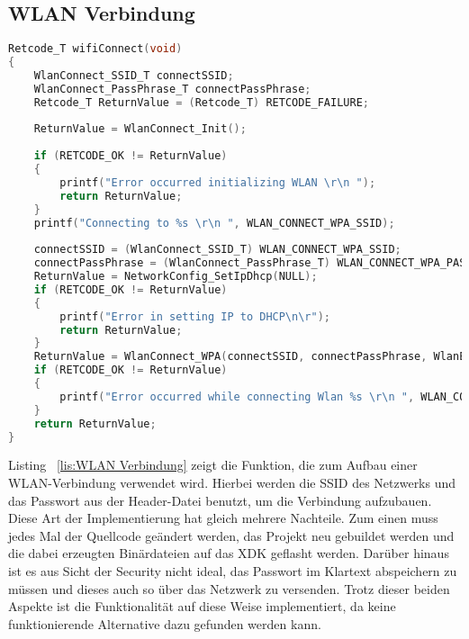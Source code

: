\subsection{\acs{WLAN} Verbindung}\label{subsec:WLAN Verbindung}
\begin{lstlisting}[language=C, caption={WLAN Verbindung}, label=lis:WLAN Verbindung]
Retcode_T wifiConnect(void)
{
	WlanConnect_SSID_T connectSSID;
	WlanConnect_PassPhrase_T connectPassPhrase;
	Retcode_T ReturnValue = (Retcode_T) RETCODE_FAILURE;
	
	ReturnValue = WlanConnect_Init();
	
	if (RETCODE_OK != ReturnValue)
	{
		printf("Error occurred initializing WLAN \r\n ");
		return ReturnValue;
	}
	printf("Connecting to %s \r\n ", WLAN_CONNECT_WPA_SSID);
	
	connectSSID = (WlanConnect_SSID_T) WLAN_CONNECT_WPA_SSID;
	connectPassPhrase = (WlanConnect_PassPhrase_T) WLAN_CONNECT_WPA_PASS;
	ReturnValue = NetworkConfig_SetIpDhcp(NULL);
	if (RETCODE_OK != ReturnValue)
	{
		printf("Error in setting IP to DHCP\n\r");
		return ReturnValue;
	}
	ReturnValue = WlanConnect_WPA(connectSSID, connectPassPhrase, WlanEventCallback);
	if (RETCODE_OK != ReturnValue)
	{
		printf("Error occurred while connecting Wlan %s \r\n ", WLAN_CONNECT_WPA_SSID);
	}
	return ReturnValue;
}
\end{lstlisting}
Listing ~\ref{lis:WLAN Verbindung} zeigt die Funktion, die zum Aufbau einer \acs{WLAN}-Verbindung verwendet wird. Hierbei werden die \acf{SSID} des Netzwerks und das Passwort aus der Header-Datei benutzt, um die Verbindung aufzubauen. Diese Art der Implementierung hat gleich mehrere Nachteile. Zum einen muss jedes Mal der Quellcode geändert werden, das Projekt neu gebuildet werden und die dabei erzeugten Binärdateien auf das \acs{XDK} geflasht werden. Darüber hinaus ist es aus Sicht der Security nicht ideal, das Passwort im Klartext abspeichern zu müssen und dieses auch so über das Netzwerk zu versenden.\newline
Trotz dieser beiden Aspekte ist die Funktionalität auf diese Weise implementiert, da keine funktionierende Alternative dazu gefunden werden kann.
